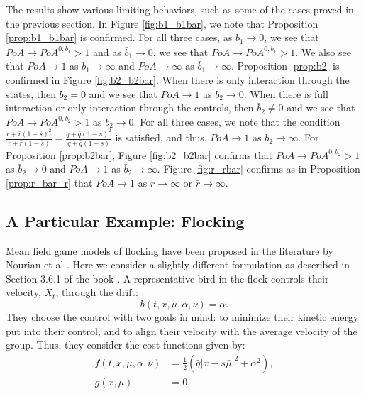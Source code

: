 \documentclass[11pt]{article}
\begin{document}
The results show various limiting behaviors, such as some of the cases proved in the previous section. In Figure \ref{fig:b1_b1bar}, we note that Proposition \ref{prop:b1_b1bar} is confirmed. For all three cases, as $b_1 \to 0$, we see that $PoA \to PoA^{0,b_1}>1$ and as $\bar{b}_1 \to 0$, we see that $PoA \to PoA^{0,\bar{b}_1}>1$. We also see that $PoA\to 1$ as $b_1 \to \infty$ and $PoA \to \infty$ as $\bar{b}_1 \to \infty$. Proposition \ref{prop:b2} is confirmed in Figure \ref{fig:b2_b2bar}. When there is only interaction through the states, then $\bar{b}_2=0$ and we see that $PoA \to 1$ as $b_2 \to 0$. When there is full interaction or only interaction through the controls, then $\bar{b}_2\neq0$ and we see that $PoA \to PoA^{0,b_2}>1$ as $b_2 \to 0$. For all three cases, we note that the condition $\frac{r + \bar{r}(1-\bar{s})^2}{r + \bar{r}(1-\bar{s})}= \frac{q + \bar{q}(1-s)^2}{q + \bar{q}(1-s)}$ is satisfied, and thus, $PoA \to 1$ as $b_2 \to \infty$. For Proposition \ref{prop:b2bar}, Figure \ref{fig:b2_b2bar} confirms that $PoA \to PoA^{0,\bar{b}_2}>1$ as $\bar{b}_2 \to 0$ and $PoA \to 1$ as $\bar{b}_2 \to \infty$. Figure \ref{fig:r_rbar} confirms as in Proposition \ref{prop:r_bar_r} that $PoA \to 1$ as $r \to \infty$ or $\bar{r} \to \infty$.

\subsection{\textbf{A Particular Example: Flocking}}
Mean field game models of flocking have been proposed in the literature by Nourian et al \cite{nourian2010synthesis}\cite{nourian2011mean}. Here we consider a slightly different formulation as described in Section 3.6.1 of the book \cite{Carmona_book}. A representative bird in the flock controls their velocity, $X_t$, through the drift:
\begin{equation*}
    b(t,x,\mu,\alpha,\nu)=\alpha.
\end{equation*}
They choose the control with two goals in mind: to minimize their kinetic energy put into their control, and to align their velocity with the average velocity of the group. Thus, they consider the cost functions given by:
\begin{equation*}
\begin{split}
    f(t,x,\mu,\alpha,\nu)&=\frac{1}{2}\left(\bar{q}|x-s\bar{\mu}|^2 +\alpha^2 \right), \\
    g(x,\mu)&=0.
\end{split}
\end{equation*}
\end{document}
